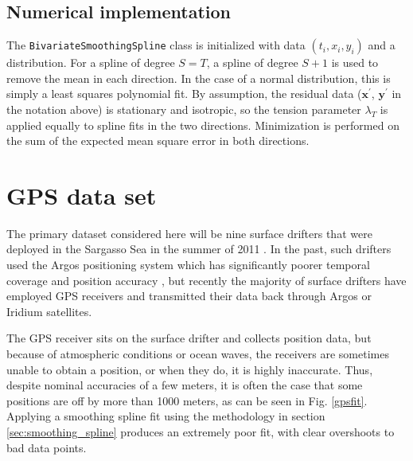 \documentclass{ametsoc}
\begin{document}
\subsection{Numerical implementation}

The \texttt{BivariateSmoothingSpline} class is initialized with data $(t_i, x_i, y_i)$ and a distribution. For a spline of degree $S=T$, a spline of degree $S+1$ is used to remove the mean in each direction. In the case of a normal distribution, this is simply a least squares polynomial fit. By assumption, the residual data ($\mathbf{x}^\prime$, $\mathbf{y}^\prime$ in the notation above) is stationary and isotropic, so the tension parameter $\lambda_T$ is applied equally to spline fits in the two directions. Minimization is performed on the sum of the expected mean square error in both directions.

\section{GPS data set}
\label{sec:drifter_data_set}


The primary dataset considered here will be nine surface drifters that were deployed in the Sargasso Sea in the summer of 2011 \citep{shcherbina2015-bams}. 
In the past, such drifters used the Argos positioning system which has significantly poorer temporal coverage and position accuracy \citep{elipot2016-jgr}, but recently the majority of surface drifters have employed GPS receivers and transmitted their data back through Argos or Iridium satellites.

The GPS receiver sits on the surface drifter and collects position data, but because of atmospheric conditions or ocean waves, the receivers are sometimes unable to obtain a position, or when they do, it is highly inaccurate. Thus, despite nominal accuracies of a few meters, it is often the case that some positions are off by more than 1000 meters, as can be seen in Fig. \ref{gpsfit}. Applying a smoothing spline fit using the methodology in section \ref{sec:smoothing_spline} produces an extremely poor fit, with clear overshoots to bad data points.
\end{document}
